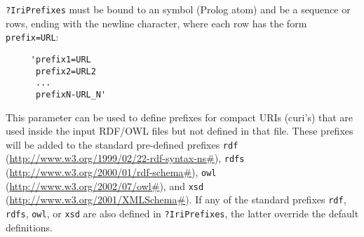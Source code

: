 
  \texttt{?IriPrefixes} must be bound to an \ERGO symbol (Prolog atom) and
  be a sequence or rows, ending with the newline character,
  where each row has the form \texttt{prefix=URL}: 
\begin{verbatim}
     'prefix1=URL
      prefix2=URL2
      ...
      prefixN-URL_N'
\end{verbatim}
  This parameter can be used to define prefixes for compact URIs (curi's)
  that are
  used inside the input RDF/OWL files but not defined in that file. These prefixes will be added to the
  standard pre-defined prefixes \texttt{rdf}
  (\url{http://www.w3.org/1999/02/22-rdf-syntax-ns#}), \texttt{rdfs}
  (\url{http://www.w3.org/2000/01/rdf-schema#}), \texttt{owl}
  (\url{http://www.w3.org/2002/07/owl#}), and
  \texttt{xsd} (\url{http://www.w3.org/2001/XMLSchema#}).
  If any of the standard prefixes \texttt{rdf}, \texttt{rdfs},
  \texttt{owl}, or \texttt{xsd}     are also defined in
  \texttt{?IriPrefixes}, the latter override the default definitions.

